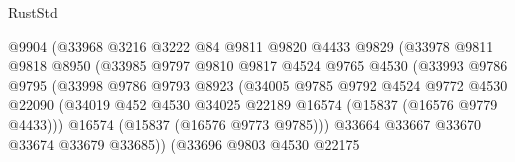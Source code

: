 \begin{lexlean}{RustStd}
\begin{coremodule}
{\begin{coremodule}
{{{{{{{{{{{{{{{{{{{{{{{{{{{{{{{{{{{{{{{{{{{{{{{{{{{{{{{{{{{{                                  @9904
                                  (@33968
                                    @3216
                                    @3222
                                    @84
                                    @9811
                                    @9820
                                    @4433
                                    @9829
                                    (@33978
                                      @9811
                                      @9818
                                      @8950
                                      (@33985
                                        @9797
                                        @9810
                                        @9817
                                        @4524
                                        @9765
                                        @4530
                                        (@33993
                                          @9786
                                          @9795
                                          (@33998
                                            @9786
                                            @9793
                                            @8923
                                            (@34005
                                              @9785
                                              @9792
                                              @4524
                                              @9772
                                              @4530
                                              @22090
                                              (@34019
                                                @452
                                                @4530
                                                @34025
                                                @22189
                                                @16574
                                                (@15837 (@16576 @9779 @4433)))
                                              @16574
                                              (@15837 (@16576 @9773 @9785)))
                                            @33664
                                            @33667
                                            @33670
                                            @33674
                                            @33679
                                            @33685))
                                        (@33696
                                          @9803
                                          @4530
                                          @22175
}}}}}}}}}}}}}}}}}}}}}}}}}}}}}}}}}}}}}}}}}}}}}}}}}}}}}}}}}}}}
\end{coremodule}}
\end{coremodule}
\end{lexlean}
